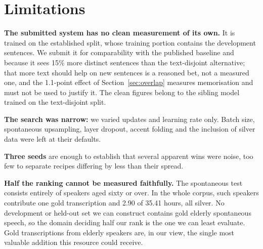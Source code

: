 \section{Limitations}
\label{sec:limitations}

\textbf{The submitted system has no clean measurement of its own.} It is
trained on the established split, whose training portion contains the
development sentences. We submit it for comparability with the published
baseline and because it sees 15\% more distinct sentences than the
text-disjoint alternative; that more text should help on new sentences is a
reasoned bet, not a measured one, and the 1.1-point effect of
Section~\ref{sec:overlap} measures memorisation and must not be used to justify
it. The clean figures belong to the sibling model trained on the text-disjoint
split.

\textbf{The search was narrow:} we varied updates and learning rate only.
Batch size, spontaneous upsampling, layer dropout, accent folding and the
inclusion of silver data were left at their defaults.

\textbf{Three seeds} are enough to establish that several apparent wins were
noise, too few to separate recipes differing by less than their spread.

\textbf{Half the ranking cannot be measured faithfully.} The spontaneous test
consists entirely of speakers aged sixty or over. In the whole corpus, such
speakers contribute one gold transcription and 2.90 of 35.41 hours, all silver.
No development or held-out set we can construct contains gold elderly
spontaneous speech, so the domain deciding half our rank is the one we can
least evaluate. Gold transcriptions from elderly speakers are, in our view, the
single most valuable addition this resource could receive.

